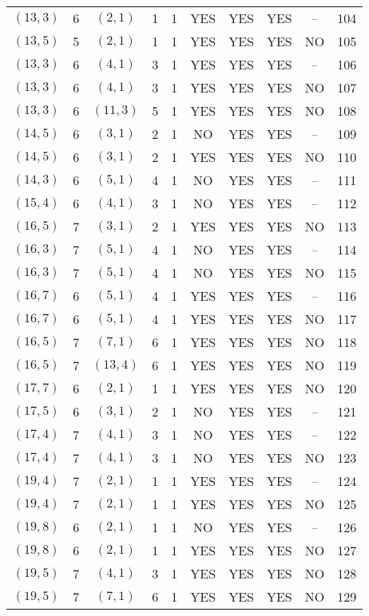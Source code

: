 \begin{longtable}{|c|c|c|c|c|c|c|c|c|c|}
$(13, 3)$ & 6 & $(2, 1)$ & 1 & 1 & YES & YES & YES & -- & 104\\
$(13, 5)$ & 5 & $(2, 1)$ & 1 & 1 & YES & YES & YES & NO & 105\\
$(13, 3)$ & 6 & $(4, 1)$ & 3 & 1 & YES & YES & YES & -- & 106\\
$(13, 3)$ & 6 & $(4, 1)$ & 3 & 1 & YES & YES & YES & NO & 107\\
$(13, 3)$ & 6 & $(11, 3)$ & 5 & 1 & YES & YES & YES & NO & 108\\
$(14, 5)$ & 6 & $(3, 1)$ & 2 & 1 & NO & YES & YES & -- & 109\\
$(14, 5)$ & 6 & $(3, 1)$ & 2 & 1 & YES & YES & YES & NO & 110\\
$(14, 3)$ & 6 & $(5, 1)$ & 4 & 1 & NO & YES & YES & -- & 111\\
$(15, 4)$ & 6 & $(4, 1)$ & 3 & 1 & NO & YES & YES & -- & 112\\
$(16, 5)$ & 7 & $(3, 1)$ & 2 & 1 & YES & YES & YES & NO & 113\\
$(16, 3)$ & 7 & $(5, 1)$ & 4 & 1 & NO & YES & YES & -- & 114\\
$(16, 3)$ & 7 & $(5, 1)$ & 4 & 1 & NO & YES & YES & NO & 115\\
$(16, 7)$ & 6 & $(5, 1)$ & 4 & 1 & YES & YES & YES & -- & 116\\
$(16, 7)$ & 6 & $(5, 1)$ & 4 & 1 & YES & YES & YES & NO & 117\\
$(16, 5)$ & 7 & $(7, 1)$ & 6 & 1 & YES & YES & YES & NO & 118\\
$(16, 5)$ & 7 & $(13, 4)$ & 6 & 1 & YES & YES & YES & NO & 119\\
$(17, 7)$ & 6 & $(2, 1)$ & 1 & 1 & YES & YES & YES & NO & 120\\
$(17, 5)$ & 6 & $(3, 1)$ & 2 & 1 & NO & YES & YES & -- & 121\\
$(17, 4)$ & 7 & $(4, 1)$ & 3 & 1 & NO & YES & YES & -- & 122\\
$(17, 4)$ & 7 & $(4, 1)$ & 3 & 1 & NO & YES & YES & NO & 123\\
$(19, 4)$ & 7 & $(2, 1)$ & 1 & 1 & YES & YES & YES & -- & 124\\
$(19, 4)$ & 7 & $(2, 1)$ & 1 & 1 & YES & YES & YES & NO & 125\\
$(19, 8)$ & 6 & $(2, 1)$ & 1 & 1 & NO & YES & YES & -- & 126\\
$(19, 8)$ & 6 & $(2, 1)$ & 1 & 1 & YES & YES & YES & NO & 127\\
$(19, 5)$ & 7 & $(4, 1)$ & 3 & 1 & YES & YES & YES & NO & 128\\
$(19, 5)$ & 7 & $(7, 1)$ & 6 & 1 & YES & YES & YES & NO & 129\\

\end{longtable}
